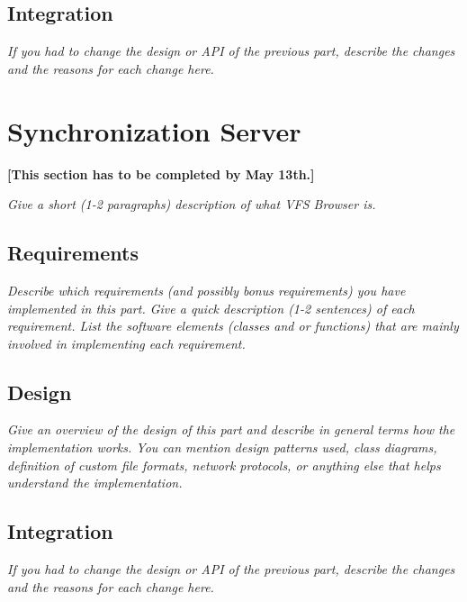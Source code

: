 \documentclass[a4paper,12pt]{article}
\begin{document}
\subsection{Integration}

\emph{If you had to change the design or API of the previous part, describe the changes and the reasons for each change here.}




\section{Synchronization Server}

\textbf{[This section has to be completed by May 13th.]}

\emph{Give a short (1-2 paragraphs) description of what VFS Browser is.}


\subsection{Requirements}

\emph{Describe which requirements (and possibly bonus requirements) you have implemented in this part. Give a quick description (1-2 sentences) of each requirement. List the software elements (classes and or functions) that are mainly involved in implementing each requirement.}


\subsection{Design}

\emph{Give an overview of the design of this part and describe in general terms how the implementation works. You can mention design patterns used, class diagrams, definition of custom file formats, network protocols, or anything else that helps understand the implementation.}


\subsection{Integration}

\emph{If you had to change the design or API of the previous part, describe the changes and the reasons for each change here.}
\end{document}

